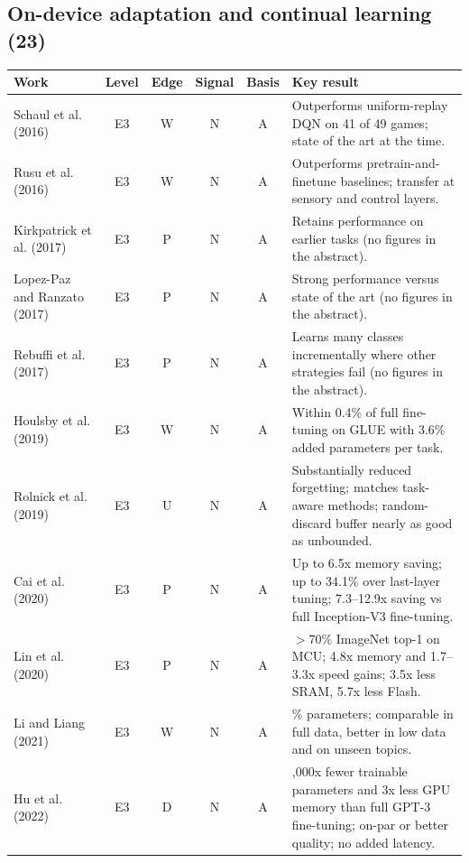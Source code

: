 \documentclass[10pt,a4paper]{article}
\begin{document}
\subsection*{On-device adaptation and continual learning (23)}
\begin{longtable}{@{}>{\raggedright\arraybackslash}p{4.0cm}cccc>{\raggedright\arraybackslash}p{7.6cm}@{}}
\toprule \textbf{Work} & \textbf{Level} & \textbf{Edge} & \textbf{Signal} & \textbf{Basis} & \textbf{Key result} \\ \midrule \endhead
Schaul et al. (2016)~\cite{Schaul2016} & E3 & W & N & A & Outperforms uniform-replay DQN on 41 of 49 games; state of the art at the time. \\
Rusu et al. (2016)~\cite{Rusu2016} & E3 & W & N & A & Outperforms pretrain-and-finetune baselines; transfer at sensory and control layers. \\
Kirkpatrick et al. (2017)~\cite{Kirkpatrick2017} & E3 & P & N & A & Retains performance on earlier tasks (no figures in the abstract). \\
Lopez-Paz and Ranzato (2017)~\cite{LopezPaz2017} & E3 & P & N & A & Strong performance versus state of the art (no figures in the abstract). \\
Rebuffi et al. (2017)~\cite{Rebuffi2017} & E3 & P & N & A & Learns many classes incrementally where other strategies fail (no figures in the abstract). \\
Houlsby et al. (2019)~\cite{Houlsby2019} & E3 & W & N & A & Within 0.4\% of full fine-tuning on GLUE with 3.6\% added parameters per task. \\
Rolnick et al. (2019)~\cite{Rolnick2019} & E3 & U & N & A & Substantially reduced forgetting; matches task-aware methods; random-discard buffer nearly as good as unbounded. \\
Cai et al. (2020)~\cite{Cai2020} & E3 & P & N & A & Up to 6.5x memory saving; up to 34.1\% over last-layer tuning; 7.3--12.9x saving vs full Inception-V3 fine-tuning. \\
Lin et al. (2020)~\cite{Lin2020} & E3 & P & N & A & $>$70\% ImageNet top-1 on MCU; 4.8x memory and 1.7--3.3x speed gains; 3.5x less SRAM, 5.7x less Flash. \\
Li and Liang (2021)~\cite{Li2021} & E3 & W & N & A & 0.1\% parameters; comparable in full data, better in low data and on unseen topics. \\
Hu et al. (2022)~\cite{Hu2022} & E3 & D & N & A & 10,000x fewer trainable parameters and 3x less GPU memory than full GPT-3 fine-tuning; on-par or better quality; no added latency. \\

\end{longtable}
\end{document}
